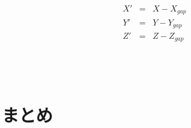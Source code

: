 		\begin{eqnarray*}
			X'&=&X - X_{gap}\\
			Y'&=&Y - Y_{gap}\\
			Z'&=&Z - Z_{gap}
		\end{eqnarray*}

	
\section{}
	\subsection{}
	\subsection{}　

\section{}

\section{まとめ}

